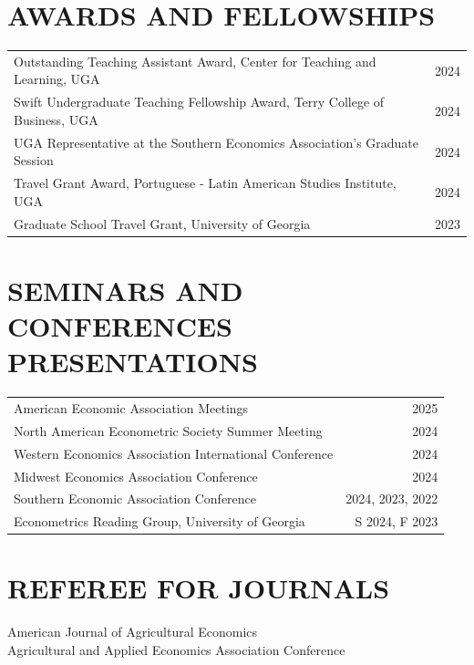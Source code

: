 \documentclass[11pt,letterpaper]{article}
\begin{document}
\section*{AWARDS AND FELLOWSHIPS}
\begin{tabularx}{\textwidth}{Xr}
    Outstanding Teaching Assistant Award, Center for Teaching and Learning, UGA & 2024 \\
    Swift Undergraduate Teaching Fellowship Award, Terry College of Business, UGA & 2024 \\
    UGA Representative at the Southern Economics Association's Graduate Session & 2024 \\
    Travel Grant Award, Portuguese - Latin American Studies Institute, UGA & 2024 \\
    Graduate School Travel Grant, University of Georgia & 2023 \\
\end{tabularx}

\section*{SEMINARS AND CONFERENCES PRESENTATIONS}
\begin{tabularx}{\textwidth}{Xr}
    American Economic Association Meetings & 2025 \\
    North American Econometric Society Summer Meeting & 2024 \\
    Western Economics Association International Conference & 2024 \\
    Midwest Economics Association Conference & 2024 \\
    Southern Economic Association Conference & 2024, 2023, 2022 \\
    Econometrics Reading Group, University of Georgia & S 2024, F 2023 \\
\end{tabularx}

\section*{REFEREE FOR JOURNALS}
\hspace{2em} American Journal of Agricultural Economics \\
\hspace{2em} Agricultural and Applied Economics Association Conference
\end{document}
